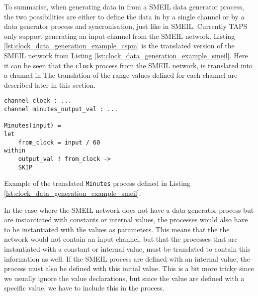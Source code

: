 To summarise, when generating data in \cspm{} from a SMEIL data generator process, the two possibilities are either to define the data in \cspm by a single channel or by a data generator process and syncronisation, just like in SMEIL.
Currently TAPS only support generating an input channel from the SMEIL network.
Listing \ref{lst:clock_data_generation_example_cspm} is the translated version of the SMEIL network from Listing \ref{lst:clock_data_generation_example_smeil}. Here it can be seen that the \texttt{clock} process from the SMEIL network, is translated into a channel in \cspm{}
The translation of the range values defined for each channel are described later in this section.
\begin{listing}
\begin{verbatim}
channel clock : ...
channel minutes_output_val : ...

Minutes(input) =
let
    from_clock = input / 60
within
    output_val ! from_clock ->
    SKIP

\end{verbatim}
\caption{Example of the translated \texttt{Minutes} process defined in Listing \ref{lst:clock_data_generation_example_smeil}.}
\label{lst:clock_data_generation_example_cspm}
\end{listing}

In the case where the SMEIL network does not have a data generator process but are instantiated with constants or internal values, the \cspm processes would also have to be instantiated with the values as parameters. This means that the the \cspm{} network would not contain an input channel, but that the processes that are instantiated with a constant or internal value, must be translated to contain this information as well.
If the SMEIL process are defined with an internal value, the \cspm{} process must also be defined with this initial value. This is a bit more tricky since we usually ignore the value declarations, but since the value are defined with a specific value, we have to include this in the process.


